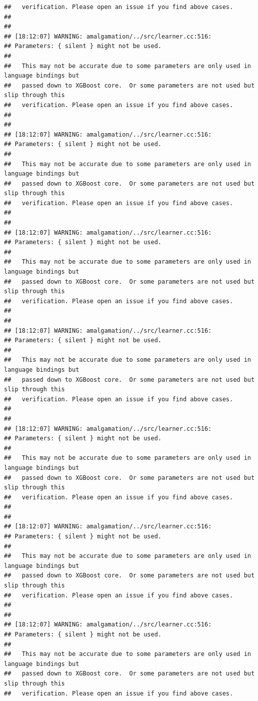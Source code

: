 \documentclass[AMS,STIX2COL]{WileyNJD-v2}\usepackage[]{graphicx}\usepackage[]{color}
\makeatletter
\newenvironment{kframe}{%
 \def\at@end@of@kframe{}%
 \ifinner\ifhmode%
  \def\at@end@of@kframe{\end{minipage}}%
  \begin{minipage}{\columnwidth}%
 \fi\fi%
 \def\FrameCommand##1{\hskip\@totalleftmargin \hskip-\fboxsep
 \colorbox{shadecolor}{##1}\hskip-\fboxsep
     \hskip-\linewidth \hskip-\@totalleftmargin \hskip\columnwidth}%
 \MakeFramed {\advance\hsize-\width
   \@totalleftmargin\z@ \linewidth\hsize
   \@setminipage}}%
 {\par\unskip\endMakeFramed%
 \at@end@of@kframe}
\newenvironment{knitrout}{}{} %
\makeatother
\begin{document}
\begin{knitrout}
\begin{kframe}
\begin{verbatim}
##   verification. Please open an issue if you find above cases.
## 
## 
## [18:12:07] WARNING: amalgamation/../src/learner.cc:516: 
## Parameters: { silent } might not be used.
## 
##   This may not be accurate due to some parameters are only used in language bindings but
##   passed down to XGBoost core.  Or some parameters are not used but slip through this
##   verification. Please open an issue if you find above cases.
## 
## 
## [18:12:07] WARNING: amalgamation/../src/learner.cc:516: 
## Parameters: { silent } might not be used.
## 
##   This may not be accurate due to some parameters are only used in language bindings but
##   passed down to XGBoost core.  Or some parameters are not used but slip through this
##   verification. Please open an issue if you find above cases.
## 
## 
## [18:12:07] WARNING: amalgamation/../src/learner.cc:516: 
## Parameters: { silent } might not be used.
## 
##   This may not be accurate due to some parameters are only used in language bindings but
##   passed down to XGBoost core.  Or some parameters are not used but slip through this
##   verification. Please open an issue if you find above cases.
## 
## 
## [18:12:07] WARNING: amalgamation/../src/learner.cc:516: 
## Parameters: { silent } might not be used.
## 
##   This may not be accurate due to some parameters are only used in language bindings but
##   passed down to XGBoost core.  Or some parameters are not used but slip through this
##   verification. Please open an issue if you find above cases.
## 
## 
## [18:12:07] WARNING: amalgamation/../src/learner.cc:516: 
## Parameters: { silent } might not be used.
## 
##   This may not be accurate due to some parameters are only used in language bindings but
##   passed down to XGBoost core.  Or some parameters are not used but slip through this
##   verification. Please open an issue if you find above cases.
## 
## 
## [18:12:07] WARNING: amalgamation/../src/learner.cc:516: 
## Parameters: { silent } might not be used.
## 
##   This may not be accurate due to some parameters are only used in language bindings but
##   passed down to XGBoost core.  Or some parameters are not used but slip through this
##   verification. Please open an issue if you find above cases.
## 
## 
## [18:12:07] WARNING: amalgamation/../src/learner.cc:516: 
## Parameters: { silent } might not be used.
## 
##   This may not be accurate due to some parameters are only used in language bindings but
##   passed down to XGBoost core.  Or some parameters are not used but slip through this
##   verification. Please open an issue if you find above cases.

\end{verbatim}
\end{kframe}
\end{knitrout}
\end{document}
